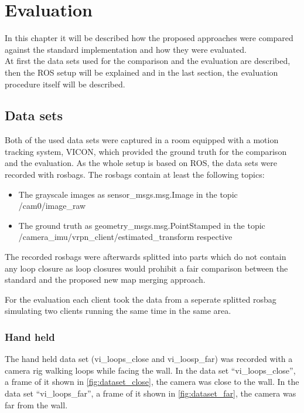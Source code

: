 \chapter{Evaluation}
In this chapter it will be described how the proposed approaches were compared against the standard implementation and how they were evaluated.\\
At first the data sets used for the comparison and the evaluation are described, then the \acf{ROS} setup will be explained and in the last section, the evaluation procedure itself will be described.

\section{Data sets}
Both of the used data sets were captured in a room equipped with a motion tracking system, VICON, which provided the ground truth for the comparison and the evaluation. As the whole setup is based on \ac{ROS}, the data sets were recorded with rosbags. The rosbags contain at least the following topics:
\begin{itemize}
  \item The grayscale images as sensor\_msgs.msg.Image in the topic /cam0/image\_raw
  \item The ground truth as geometry\_msgs.msg.PointStamped in the topic /camera\_imu/vrpn\_client/estimated\_transform respective
\end{itemize}

The recorded rosbags were afterwards splitted into parts which do not contain any loop closure as loop closures would prohibit a fair comparison between the standard and the proposed new map merging approach.

For the evaluation each client took the data from a seperate splitted rosbag simulating two clients running the same time in the same area.

\subsection{Hand held}
The hand held data set (vi\_loops\_close and vi\_loosp\_far) was recorded with a camera rig walking loops while facing the wall. In the data set ``vi\_loops\_close'', a frame of it shown in \autoref{fig:dataset_close}, the camera was close to the wall. In the data set ``vi\_loops\_far'', a frame of it shown in \autoref{fig:dataset_far}, the camera was far from the wall.

